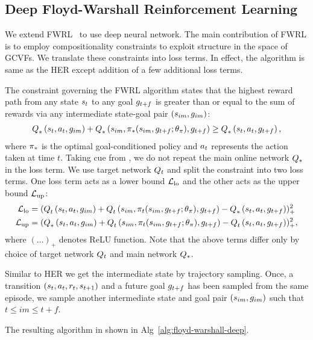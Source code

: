 \subsection{Deep Floyd-Warshall Reinforcement Learning}

We extend FWRL~\citep{dhiman2018floydwarshall} to use deep neural network.
The main contribution of FWRL is to employ compositionality constraints to
exploit structure in the space of GCVFs.
We translate these constraints into loss terms.
In effect, the algorithm is same as the HER except
addition of a few additional loss terms.


The constraint governing the FWRL algorithm states that the highest reward path
from any state $\state_t$ to any goal $\goal_{t+f}$ is greater than or equal to
the sum of rewards via any intermediate state-goal pair $(\state_{im}, \goal_{im})$:
%
\begin{align}
      \fwargs{\state_{t}}{\act_t}{\goal_{im}}{*}{}
      + \fwargs{\state_{im}}{\policy_*(\state_{im}, \goal_{t+f};\param_\policy)}{\goal_{t+f}}{*}{}
      \ge \fwargs{\state_{t}}{\act_t}{\goal_{t+f}}{*}{},
\end{align}%
% 
where $\policy_*$ is the optimal goal-conditioned policy and $\act_t$ represents
the action taken at time $t$. Taking cue from \citet{MnKaSiNATURE2015}, we do
not repeat the main online network $\Q_*$ in the loss term. We use target
network $\Q_t$ and split the constraint into two loss terms. One loss term acts
as a lower bound $\LossLo$ and the other acts as the upper bound $\LossUp$:
%
\begin{align}
  \LossLo &= (
      \fwargs{\state_{t}}{\act_t}{\goal_{im}}{t}{}
      + \fwargs{\state_{im}}{\policy_t(\state_{im}, \goal_{t+f};\param_\policy)}{\goal_{t+f}}{t}{}
      - \fwargs{\state_{t}}{\act_t}{\goal_{t+f}}{*}{}
      )_+^2
                         \\
  \LossUp &= (
      \fwargs{\state_{t}}{\act_t}{\goal_{im}}{*}{}
      + \fwargs{\state_{im}}{\policy_t(\state_{im}, \goal_{t+f};\param_\policy)}{\goal_{t+f}}{t}{}
      - \fwargs{\state_{t}}{\act_t}{\goal_{t+f}}{t}{}
      )_+^2,
\end{align}%
% 
where $(\dots)_+$ denotes ReLU function.
Note that the above terms differ only by choice of target network $\fw_t$ and
main network $\fw_*$. 

Similar to HER we get the intermediate state by trajectory sampling. Once,
a transition $(\state_t, \act_t, \rew_t, \state_{t+1})$ and a future goal
$\goal_{t+f}$ has been sampled from the same episode, we sample another
intermediate state and goal pair $(\state_{im}, \goal_{im})$ such that $t \le im
\le t + f$.
% 

The resulting algorithm in shown in Alg~\ref{alg:floyd-warshall-deep}.


